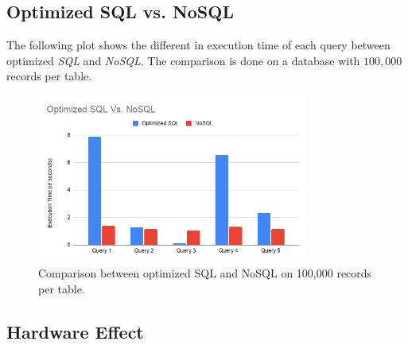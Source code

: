 \subsection{Optimized SQL vs. NoSQL}
The following plot shows the different in execution time of each query between optimized \emph{SQL} and \emph{NoSQL}. The comparison is done on a database with $100,000$ records per table.
\begin{figure}[H]
    \centering
    \includegraphics[width=0.8\textwidth]{images/stats/sql-vs-nosql.png}
    \caption{Comparison between optimized SQL and NoSQL on 100,000 records per table.}
    \label{fig:db-size-2}
\end{figure}

\subsection{Hardware Effect}
